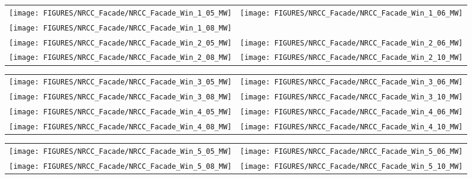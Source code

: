\begin{figure}[p]
\begin{tabular*}{\textwidth}{l@{\extracolsep{\fill}}r}
\texttt{[image: FIGURES/NRCC\_Facade/NRCC\_Facade\_Win\_1\_05\_MW]} &
\texttt{[image: FIGURES/NRCC\_Facade/NRCC\_Facade\_Win\_1\_06\_MW]} \\
\texttt{[image: FIGURES/NRCC\_Facade/NRCC\_Facade\_Win\_1\_08\_MW]} &
  \\
\texttt{[image: FIGURES/NRCC\_Facade/NRCC\_Facade\_Win\_2\_05\_MW]} &
\texttt{[image: FIGURES/NRCC\_Facade/NRCC\_Facade\_Win\_2\_06\_MW]} \\
\texttt{[image: FIGURES/NRCC\_Facade/NRCC\_Facade\_Win\_2\_08\_MW]} &
\texttt{[image: FIGURES/NRCC\_Facade/NRCC\_Facade\_Win\_2\_10\_MW]}
\end{tabular*}
\label{NRCC_Facade_1}
\end{figure}

\begin{figure}[p]
\begin{tabular*}{\textwidth}{l@{\extracolsep{\fill}}r}
\texttt{[image: FIGURES/NRCC\_Facade/NRCC\_Facade\_Win\_3\_05\_MW]} &
\texttt{[image: FIGURES/NRCC\_Facade/NRCC\_Facade\_Win\_3\_06\_MW]} \\
\texttt{[image: FIGURES/NRCC\_Facade/NRCC\_Facade\_Win\_3\_08\_MW]} &
\texttt{[image: FIGURES/NRCC\_Facade/NRCC\_Facade\_Win\_3\_10\_MW]} \\
\texttt{[image: FIGURES/NRCC\_Facade/NRCC\_Facade\_Win\_4\_05\_MW]} &
\texttt{[image: FIGURES/NRCC\_Facade/NRCC\_Facade\_Win\_4\_06\_MW]} \\
\texttt{[image: FIGURES/NRCC\_Facade/NRCC\_Facade\_Win\_4\_08\_MW]} &
\texttt{[image: FIGURES/NRCC\_Facade/NRCC\_Facade\_Win\_4\_10\_MW]}
\end{tabular*}
\label{NRCC_Facade_2}
\end{figure}

\begin{figure}[p]
\begin{tabular*}{\textwidth}{l@{\extracolsep{\fill}}r}
\texttt{[image: FIGURES/NRCC\_Facade/NRCC\_Facade\_Win\_5\_05\_MW]} &
\texttt{[image: FIGURES/NRCC\_Facade/NRCC\_Facade\_Win\_5\_06\_MW]} \\
\texttt{[image: FIGURES/NRCC\_Facade/NRCC\_Facade\_Win\_5\_08\_MW]} &
\texttt{[image: FIGURES/NRCC\_Facade/NRCC\_Facade\_Win\_5\_10\_MW]}
\end{tabular*}
\label{NRCC_Facade_3}
\end{figure}


\clearpage

